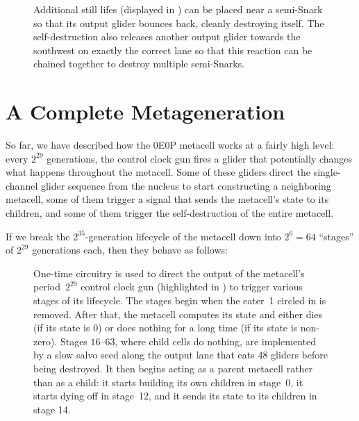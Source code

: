 \begin{figure}[!htb]
	\centering
	\caption{Additional still lifes (displayed in ) can be placed near a semi-Snark so that its output glider bounces back, cleanly destroying itself. The self-destruction also releases another output glider towards the southwest on exactly the correct lane so that this reaction can be chained together to destroy multiple semi-Snarks.}
	\label{fig:semi_snark_self_destruct}
\end{figure}


\section{A Complete Metageneration}\label{sec:0e0p_timeline}

So far, we have described how the 0E0P metacell works at a fairly high level: every $2^{29}$ generations, the control clock gun fires a glider that potentially changes what happens throughout the metacell. Some of these gliders direct the single-channel glider sequence from the nucleus to start constructing a neighboring metacell, some of them trigger a signal that sends the metacell's state to its children, and some of them trigger the self-destruction of the entire metacell.

If we break the $2^{35}$-generation lifecycle of the metacell down into $2^6 = 64$ ``stages'' of $2^{29}$ generations each, then they behave as follows:\smallskip

\begin{figure}[!htbp]
	\centering
	\caption{One-time circuitry is used to direct the output of the metacell's period~$2^{29}$ control clock gun (highlighted in ) to trigger various stages of its lifecycle. The stages begin when the eater~1 circled in  is removed. After that, the metacell computes its state and either dies (if its state is 0) or does nothing for a long time (if its state is non-zero). Stages $16$--$63$, where child cells do nothing, are implemented by a slow salvo seed along the output lane that eats $48$ gliders before being destroyed. It then begins acting as a parent metacell rather than as a child: it starts building its own children in stage~0, it starts dying off in stage~12, and it sends its state to its children in stage 14.}
	\label{fig:0e0p_clock_gun_full}
\end{figure}

